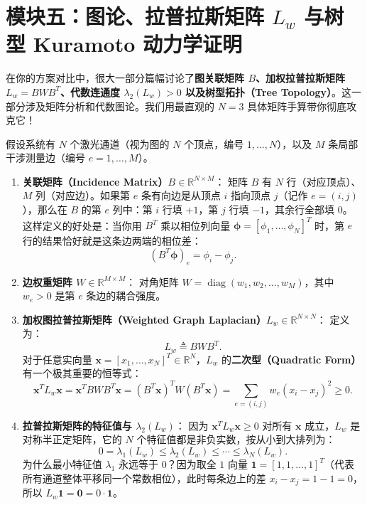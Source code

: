 \documentclass[UTF8, a4paper, 11pt]{ctexart}
\newcommand{\R}{\mathbb{R}}
\DeclareMathOperator{\diag}{diag}
\begin{document}
\section{模块五：图论、拉普拉斯矩阵 \texorpdfstring{$L_w$}{Lw} 与树型 Kuramoto 动力学证明}

在你的方案对比中，很大一部分篇幅讨论了\textbf{图关联矩阵 $B$、加权拉普拉斯矩阵 $L_w = BWB^T$、代数连通度 $\lambda_2(L_w) > 0$ 以及树型拓扑（Tree Topology）}。这一部分涉及矩阵分析和代数图论。我们用最直观的 $N=3$ 具体矩阵手算带你彻底攻克它！

\begin{mathprep}
假设系统有 $N$ 个激光通道（视为图的 $N$ 个顶点，编号 $1, \dots, N$），以及 $M$ 条局部干涉测量边（编号 $e = 1, \dots, M$）。
\begin{enumerate}[label=\textbf{\arabic*.}]
    \item \textbf{关联矩阵（Incidence Matrix）$B \in \R^{N \times M}$}：
    矩阵 $B$ 有 $N$ 行（对应顶点）、$M$ 列（对应边）。如果第 $e$ 条有向边是从顶点 $i$ 指向顶点 $j$（记作 $e = (i, j)$），那么在 $B$ 的第 $e$ 列中：第 $i$ 行填 $+1$，第 $j$ 行填 $-1$，其余行全部填 $0$。
    这样定义的好处是：当你用 $B^T$ 乘以相位列向量 $\bm{\phi} = [\phi_1, \dots, \phi_N]^T$ 时，第 $e$ 行的结果恰好就是这条边两端的相位差：
    \[
        (B^T \bm{\phi})_e = \phi_i - \phi_j.
    \]
    \item \textbf{边权重矩阵 $W \in \R^{M \times M}$}：
    对角矩阵 $W = \diag(w_1, w_2, \dots, w_M)$，其中 $w_e > 0$ 是第 $e$ 条边的耦合强度。
    \item \textbf{加权图拉普拉斯矩阵（Weighted Graph Laplacian）$L_w \in \R^{N \times N}$}：
    定义为：
    \[
        L_w \triangleq B W B^T.
    \]
    对于任意实向量 $\bm{x} = [x_1, \dots, x_N]^T \in \R^N$，$L_w$ 的\textbf{二次型（Quadratic Form）}有一个极其重要的恒等式：
    \[
        \bm{x}^T L_w \bm{x} = \bm{x}^T B W B^T \bm{x} = (B^T \bm{x})^T W (B^T \bm{x}) = \sum_{e=(i,j)} w_e (x_i - x_j)^2 \ge 0.
    \]
    \item \textbf{拉普拉斯矩阵的特征值与 $\lambda_2(L_w)$}：
    因为 $\bm{x}^T L_w \bm{x} \ge 0$ 对所有 $\bm{x}$ 成立，$L_w$ 是对称半正定矩阵，它的 $N$ 个特征值都是非负实数，按从小到大排列为：
    \[
        0 = \lambda_1(L_w) \le \lambda_2(L_w) \le \cdots \le \lambda_N(L_w).
    \]
    为什么最小特征值 $\lambda_1$ 永远等于 $0$？因为取全 $1$ 向量 $\bm{1} = [1, 1, \dots, 1]^T$（代表所有通道整体平移同一个常数相位），此时每条边上的差 $x_i - x_j = 1 - 1 = 0$，所以 $L_w \bm{1} = \bm{0} = 0 \cdot \bm{1}$。

\end{enumerate}
\end{mathprep}
\end{document}
